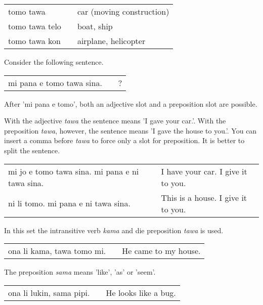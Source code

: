 \begin{supertabular}{p{5,5cm}|ll}
tomo tawa && car (moving construction) \\
tomo tawa telo && boat, ship \\
tomo tawa kon && airplane, helicopter \\
\end{supertabular} 
%

Consider the following sentence.

\begin{supertabular}{p{5,5cm}|ll}
mi pana e tomo tawa sina. && ? \\   %
\end{supertabular} 

After 'mi pana e tomo', both an adjective slot and a preposition slot are possible. 

With the adjective \textit{tawa} the sentence means 'I gave your car.'. 
With the preposition \textit{tawa}, however, the sentence means 'I gave the house to you.'. 
You can insert a comma before \textit{tawa} to force only a slot for preposition. 
It is better to split the sentence. 

\begin{supertabular}{p{5,5cm}|ll}
mi jo e tomo tawa sina. mi pana e ni tawa sina. && I have your car. I give it to you. \\
ni li tomo. mi pana e ni tawa sina. && This is a house. I give it to you. \\
\end{supertabular} 

%
%
In this set the intransitive verb \textit{kama} and die preposition \textit{tawa} is used. 

\begin{supertabular}{p{5,5cm}|ll}
ona li kama, tawa tomo mi. && He came to my house. \\
\end{supertabular} 

%
%
The preposition \textit{sama} means 'like', 'as' or 'seem'.

\begin{supertabular}{p{5,5cm}|ll}
ona li lukin, sama pipi. && He looks like a bug. \\
\end{supertabular} 

